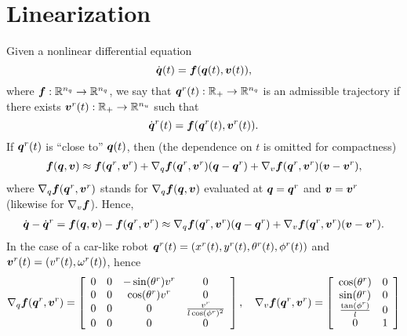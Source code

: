 \documentclass[12pt,a4paper]{article}
\newcommand{\mbm}[1]{\mbox{\boldmath $#1$}}
\begin{document}
\section{Linearization}

Given a nonlinear differential equation 
%
\[
\dot{\mbm{q}}(t) = \mbm{f}(\mbm{q}(t),\mbm{v}(t)),
\]
%
where $\mbm{f} : \mathbb{R}^{n_q} \to \mathbb{R}^{n_q}$, we say that $\mbm{q}^r(t) : \mathbb{R}_{+}
\to \mathbb{R}^{n_q}$ is an admissible trajectory if there exists $\mbm{v}^r(t) : \mathbb{R}_{+} \to
\mathbb{R}^{n_u}$ such that
%
\[
\dot{\mbm{q}}^r(t) = \mbm{f}(\mbm{q}^r(t),\mbm{v}^r(t)).
\]
%
If $\mbm{q}^r(t)$ is ``close to'' $\mbm{q}(t)$, then (the dependence on $t$ is omitted for compactness)
%
\begin{align}
\mbm{f}(\mbm{q},\mbm{v}) \approx \mbm{f}(\mbm{q}^r,\mbm{v}^r) + 
\nabla_{q}\mbm{f}(\mbm{q}^r,\mbm{v}^r)(\mbm{q}-\mbm{q}^r) + \nabla_v\mbm{f}(\mbm{q}^r,\mbm{v}^r)(\mbm{v}-\mbm{v}^r), \nonumber
\end{align}
%
where $\nabla_{q}\mbm{f}(\mbm{q}^r,\mbm{v}^r)$ stands for $\nabla_{q}\mbm{f}(\mbm{q},\mbm{v})$
evaluated at $\mbm{q} = \mbm{q}^r$ and $\mbm{v} = \mbm{v}^r$ (likewise for $\nabla_v\mbm{f}$).
Hence,
%
\begin{align}
\dot{\mbm{q}} - \dot{\mbm{q}}^r = \mbm{f}(\mbm{q},\mbm{v}) - \mbm{f}(\mbm{q}^r,\mbm{v}^r)
\approx \nabla_{q}\mbm{f}(\mbm{q}^r,\mbm{v}^r)(\mbm{q}-\mbm{q}^r) + \nabla_v\mbm{f}(\mbm{q}^r,\mbm{v}^r)(\mbm{v}-\mbm{v}^r). \nonumber
\end{align}
%
In the case of a car-like robot $\mbm{q}^r(t) = (x^r(t),y^r(t),\theta^r(t),\phi^r(t))$ and 
$\mbm{v}^r(t) = (v^r(t),\omega^r(t))$, hence
%
\[
\nabla_{q}\mbm{f}(\mbm{q}^r,\mbm{v}^r) = 
\left[
\begin{array}{cccc}
0 & 0 &-\sin(\theta^r)v^r &                 0  \\
0 & 0 & \cos(\theta^r)v^r &                 0  \\
0 & 0 &            0  & \frac{v^r}{l\cos(\phi^r)^2} \\
0 & 0 &            0  &                 0    
\end{array}
\right], \quad
%
\nabla_v\mbm{f}(\mbm{q}^r,\mbm{v}^r) = 
\left[
\begin{array}{cc}
\cos(\theta^r)  &  0 \\
\sin(\theta^r)  &  0 \\
\frac{\tan(\phi^r)}{l} & 0 \\
0 & 1
\end{array}
\right]
\]
\end{document}
